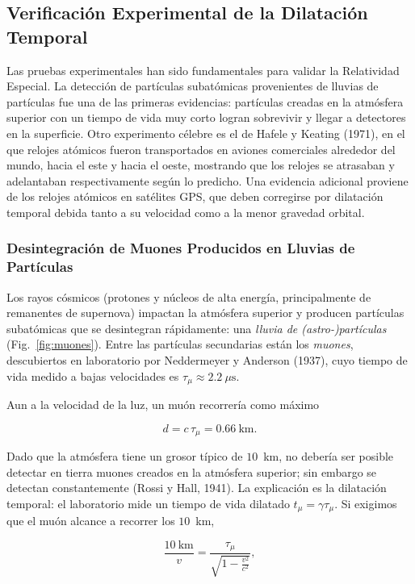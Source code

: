 \subsection{Verificación Experimental de la Dilatación Temporal}

Las pruebas experimentales han sido fundamentales para validar la Relatividad Especial. La detección de partículas subatómicas provenientes de lluvias de partículas fue una de las primeras evidencias: partículas creadas en la atmósfera superior con un tiempo de vida muy corto logran sobrevivir y llegar a detectores en la superficie. Otro experimento célebre es el de Hafele y Keating (1971), en el que relojes atómicos fueron transportados en aviones comerciales alrededor del mundo, hacia el este y hacia el oeste, mostrando que los relojes se atrasaban y adelantaban respectivamente según lo predicho. Una evidencia adicional proviene de los relojes atómicos en satélites GPS, que deben corregirse por dilatación temporal debida tanto a su velocidad como a la menor gravedad orbital.

\subsubsection{Desintegración de Muones Producidos en Lluvias de Partículas}

Los rayos cósmicos (protones y núcleos de alta energía, principalmente de remanentes de supernova) impactan la atmósfera superior y producen partículas subatómicas que se desintegran rápidamente: una \emph{lluvia de (astro-)partículas} (Fig.~\ref{fig:muones}). Entre las partículas secundarias están los \emph{muones}, descubiertos en laboratorio por Neddermeyer y Anderson (1937), cuyo tiempo de vida medido a bajas velocidades es $\tau_\mu \approx 2.2~\mu\text{s}$.



Aun a la velocidad de la luz, un muón recorrería como máximo

$$
d = c\,\tau_\mu = 0.66~\text{km}.
$$

Dado que la atmósfera tiene un grosor típico de $10$~km, no debería ser posible detectar en tierra muones creados en la atmósfera superior; sin embargo se detectan constantemente (Rossi y Hall, 1941). La explicación es la dilatación temporal: el laboratorio mide un tiempo de vida dilatado $t_\mu = \gamma\tau_\mu$. Si exigimos que el muón alcance a recorrer los $10$~km,

$$
\frac{10~\text{km}}{v} = \frac{\tau_\mu}{\sqrt{1-\frac{v^2}{c^2}}} ,
$$

